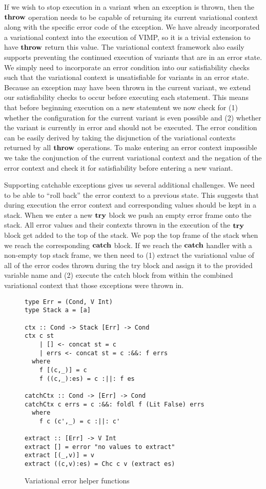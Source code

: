 \documentclass[12pt,oneside]{book}
\begin{document}
If we wish to stop execution in a variant when an exception is thrown, then the $\textbf{\textup{\textrm{throw}}}$ operation needs to be capable of returning its current variational context
along with the specific error code of the exception. We have already incorporated a variational context into the execution of VIMP, so it is a trivial extension to have $\textbf{\textup{\textrm{throw}}}$
return this value. The variational
context framework also easily supports preventing the continued execution of variants that are in an error state. We simply need to incorporate an error condition into our
satisfiability checks such that the variational context is unsatisfiable for variants in an error state. Because an exception may have been thrown in the current variant, we extend
our satisfiability checks to occur before executing each statement. This means that before beginning execution on a new statemtent we now check
for (1) whether the configuration for the current variant is even possible and (2) whether the variant is currently in error and should not be executed. The error condition can be easily derived
by taking the disjunction of the variational contexts returned by all $\textbf{\textup{\textrm{throw}}}$ operations. To make entering an error context impossible we take the conjunction of
the current variational context and the negation of the error context and check it for satisfiability before entering a new variant.

Supporting catchable exceptions gives us several additional challenges. We need to be able to ``roll back'' the error context to a previous state. This suggests that
during execution the error context and corresponding values should be kept in a stack. When we enter a new $\textbf{\textup{\textrm{try}}}$ block we push an empty error frame onto
the stack. All error values and their contexts thrown in the execution of the $\textbf{\textup{\textrm{try}}}$ block get added to the top of the stack. We pop the top frame of the stack when
we reach the corresponding $\textbf{\textup{\textrm{catch}}}$ block. If we reach the $\textbf{\textup{\textrm{catch}}}$ handler with
a non-empty top stack frame, we then need to (1) extract the variational value of all of the error codes thrown during the try block and assign it to the provided variable name and (2) execute the catch block from within the
combined variational context that those exceptions were thrown in.

\begin{figure}
\begin{lstlisting}
type Err = (Cond, V Int)
type Stack a = [a]

ctx :: Cond -> Stack [Err] -> Cond
ctx c st
    | [] <- concat st = c
    | errs <- concat st = c :&&: f errs
  where
    f [(c,_)] = c
    f ((c,_):es) = c :||: f es
    
catchCtx :: Cond -> [Err] -> Cond
catchCtx c errs = c :&&: foldl f (Lit False) errs
  where
    f c (c',_) = c :||: c'
    
extract :: [Err] -> V Int
extract [] = error "no values to extract"
extract [(_,v)] = v
extract ((c,v):es) = Chc c v (extract es)
\end{lstlisting}
\caption{Variational error helper functions}
\label{fig:errhelpers}
\end{figure}
\end{document}
